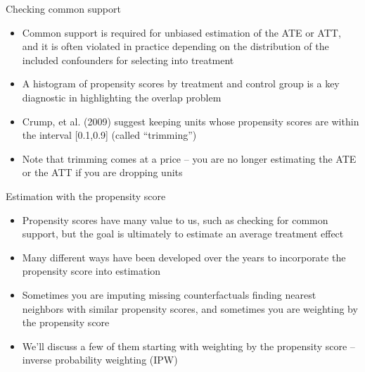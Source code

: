 \documentclass{beamer}
\begin{document}
\begin{frame}{Checking common support}
	
	\begin{itemize}
	\item Common support is required for unbiased estimation of the ATE or ATT, and it is often violated in practice depending on the distribution of the included confounders for selecting into treatment
	\item A histogram of propensity scores by treatment and control group is a key diagnostic in highlighting the overlap problem
	\item Crump, et al. (2009) suggest keeping units whose propensity scores are within the interval [0.1,0.9] (called ``trimming'')
	\item Note that trimming comes at a price -- you are no longer estimating the ATE or the ATT if you are dropping units
	\end{itemize}
	
\end{frame}




\begin{frame}{Estimation with the propensity score}

\begin{itemize}
\item Propensity scores have many value to us, such as checking for common support, but the goal is ultimately to estimate an average treatment effect
\item Many different ways have been developed over the years to incorporate the propensity score into estimation
\item Sometimes you are imputing missing counterfactuals finding nearest neighbors with similar propensity scores, and sometimes you are weighting by the propensity score
\item We'll discuss a few of them starting with weighting by the propensity score -- inverse probability weighting (IPW)
\end{itemize}

\end{frame}
\end{document}
